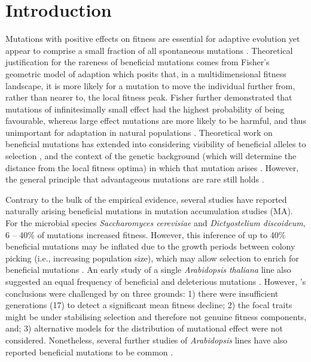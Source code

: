 \section{Introduction} 
Mutations with positive effects on fitness are essential for adaptive evolution yet appear to comprise a small fraction of all spontaneous mutations \citep{Fish30, Simm77, Houl96, Lync99, Keig03, Eyre07, Hall09}. Theoretical justification for the rareness of beneficial mutations comes from Fisher’s geometric model of adaption \citep[FGM,][]{Fish30} which posits that, in a multidimensional fitness landscape, it is more likely for a mutation to move the individual further from, rather than nearer to, the local fitness peak. Fisher further demonstrated that mutations of infinitesimally small effect had the highest probability of being favourable, whereas large effect mutations are more likely to be harmful, and thus unimportant for adaptation in natural populations \citep{Fish30}. Theoretical work on beneficial mutations has extended into considering visibility of beneficial alleles to selection \citep[intermediate effect mutations are more likely to overcome stochastic process at initial frequencies,][]{Kimu83}, and the context of the genetic background (which will determine the distance from the local fitness optima) in which that mutation arises \citep{Orr98}. However, the general principle that advantageous mutations are rare still holds \citep{Houl96, Lync99, Hall09}.\par

Contrary to the bulk of the empirical evidence, several studies have reported naturally arising beneficial mutations in mutation accumulation studies (MA). For the microbial species \textit{Saccharomyces cerevisiae} and \textit{Dictyostelium discoideum}, 6 – 40\% of mutations \citep{Wloc01, Zeyl01, Jose04, Hall13amoeba} increased fitness. However, this inference of up to 40\% beneficial mutations may be inflated due to the growth periods between colony picking (i.e., increasing population size), which may allow selection to enrich for beneficial mutations \citep{Jose04, Wahl22}. An early study of a single \textit{Arabidopsis thaliana} line also suggested an equal frequency of beneficial and deleterious mutations \citep{Shaw02}. However, \citet{Shaw02}’s conclusions were challenged by \citet{Keig03} on three grounds: 1) there were insufficient generations (17) to detect a significant mean fitness decline; 2) the focal traits might be under stabilising selection and therefore not genuine fitness components, and; 3) alternative models for the distribution of mutational effect were not considered. Nonetheless, several further studies of \textit{Arabidopsis} lines have also reported beneficial mutations to be common \citep{Chan03, Kava05, Rutt10, Role16}. \par

